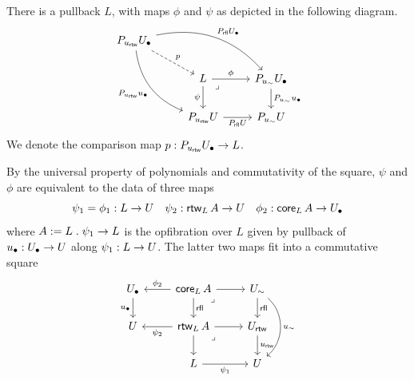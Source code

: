 \begin{axiom}\label{ax:pullback-L}
  There is a pullback $L$,
  with maps $\phi$ and $\psi$ as depicted in the following diagram.
  \begin{equation}
    \label{eq:hom-elimination-2}
    \begin{tikzcd}
    { P_{\urtw} \Ulow} && \\
    & L & {P_{\usim} \Ulow} \\
    & { P_{\urtw} \U} & {P_{\usim} \U}
    \arrow["p", dashed, from=1-1, to=2-2]
    \arrow["{P_{\rfl} \Ulow}", bend left, from=1-1, to=2-3]
    \arrow["{P_{\urtw} \ulow}"', bend right, from=1-1, to=3-2]
    \arrow["\phi", from=2-2, to=2-3]
    \arrow["\psi"', from=2-2, to=3-2]
    \arrow["\lrcorner"{anchor=center, pos=0.125}, draw=none, from=2-2, to=3-3]
    \arrow["{P_{\usim} \ulow}", from=2-3, to=3-3]
    \arrow["{P_{\rfl} \U}"', from=3-2, to=3-3]
  \end{tikzcd}
  \end{equation}
  We denote the comparison map $p : P_{\urtw} \Ulow \to L$.  
\end{axiom}
By the universal property of polynomials
and commutativity of the square,
$\psi$ and $\phi$ are equivalent to the data of three maps
\[\psi_1 = \phi_1 : L \to \U
\quad \psi_2 : \rtw[L]{A} \to \U
\quad \phi_2 : \vCore[L]{A} \to \Ulow\]
where $A := L \opext \psi_1 \to L$ is the opfibration over $L$
given by pullback of $\ulow : \Ulow \to \U$ along $\psi_1 : L \to \U$.
The latter two maps fit into a commutative square
\begin{equation}\label{eq:hom-elimination-1}
  \begin{tikzcd}
	\Ulow & {\vCore[L]{A}} & \Usim \\
	\U & {\rtw[L]{A}} & \Urtw \\
	& L & \U
	\arrow["\ulow"', from=1-1, to=2-1]
	\arrow["{\phi_2}"', from=1-2, to=1-1]
	\arrow[from=1-2, to=1-3]
	\arrow["{\rfl}", from=1-2, to=2-2]
	\arrow["\lrcorner"{anchor=center, pos=0.125}, draw=none, from=1-2, to=2-3]
	\arrow["\rfl", from=1-3, to=2-3]
	\arrow["{\usim}", bend left = 50, from=1-3, to=3-3]
	\arrow["{\psi_2}", from=2-2, to=2-1]
	\arrow[from=2-2, to=2-3]
	\arrow[from=2-2, to=3-2]
	\arrow["\lrcorner"{anchor=center, pos=0.125}, draw=none, from=2-2, to=3-3]
	\arrow["\urtw", from=2-3, to=3-3]
	\arrow["{\psi_1}"', from=3-2, to=3-3]
\end{tikzcd}
\end{equation}

